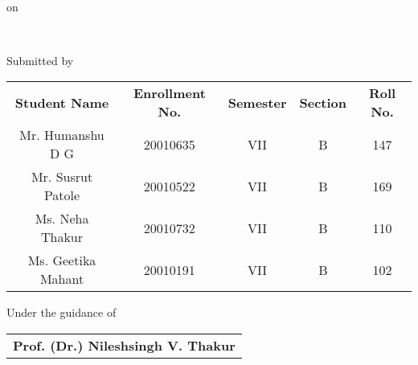 
\begin{titlepage}

    \centering



{\Large \reporttitle}\\

\vspace{1 em}
on
\vspace{1 em}

{\LARGE \reportsubtitle}\\

\vspace{4 em}

\begin{table}[H]
    \centering
        Submitted by\\
    \large
        \vspace{1 em}
    \begin{tabu} to \linewidth {C C C C C}
        
        \textbf{Student Name} & \textbf{Enrollment No.} & \textbf{Semester} & \textbf{Section} & \textbf{Roll No.}\\
        Mr. Humanshu D G & 20010635 & VII & B & 147\\
        Mr. Susrut Patole & 20010522 & VII & B & 169\\
        Ms. Neha Thakur & 20010732 & VII & B & 110\\
        Ms. Geetika Mahant & 20010191 & VII & B & 102
    \end{tabu}
\end{table}

\vspace{4 em}

\begin{table}[H]
    \centering
        Under the guidance of\\
    \large
        \vspace{1 em}
    \begin{tabu} to \linewidth {C}
        \textbf{Prof. (Dr.) Nileshsingh V. Thakur}
    \end{tabu}
\end{table}


\mbox{}
    \vfill
    \large
    \textcolor{white}{\placeanddate}
\end{titlepage}